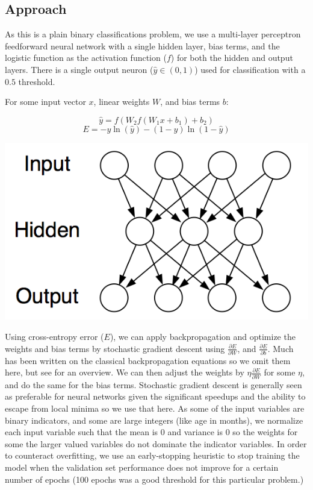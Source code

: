 \documentclass[a4paper]{article}
\theoremstyle{plain}
\begin{document}
\subsection{Approach}

As this is a plain binary classifications problem, we use a multi-layer perceptron feedforward neural network with a single hidden layer, bias terms, and the logistic function as the activation function ($f$) for both the hidden and output layers. There is a single output neuron ($\hat{y} \in (0, 1)$) used for classification with a $0.5$ threshold.

For some input vector $x$, linear weights $W$, and bias terms $b$:

\[ \hat{y} = f( W_2  f( W_1 x + b_1 ) + b_2 ) \]
\[ E = - y \ln( \hat{y} ) - (1 - y) \ln ( 1 - \hat{y} ) \]

\begin{center}\vspace{1cm}
\includegraphics[width=0.6\linewidth]{neural_network}
\end{center}\vspace{1cm}

Using cross-entropy error ($E$), we can apply backpropagation and optimize the weights and bias terms by stochastic gradient descent using $\frac{\partial E}{\partial W}$, and $\frac{\partial E}{\partial b}$. Much has been written on the classical backpropagation equations so we omit them here, but see \cite{lecun-98b} for an overview. We can then adjust the weights by $\eta \frac{\partial E}{\partial W}$ for some $\eta$, and do the same for the bias terms. Stochastic gradient descent is generally seen as preferable for neural networks given the significant speedups and the ability to escape from local minima so we use that here.\cite{lecun-98b} As some of the input variables are binary indicators, and some are large integers (like age in months), we normalize each input variable such that the mean is $0$ and variance is $0$ so the weights for some the larger valued variables do not dominate the indicator variables. In order to counteract overfitting, we use an early-stopping heuristic to stop training the model when the validation set performance does not improve for a certain number of epochs (100 epochs was a good threshold for this particular problem.)
\end{document}
